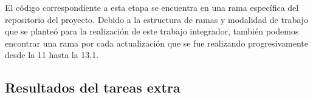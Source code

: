 El código correspondiente a esta etapa se encuentra en una rama específica del repositorio del proyecto. Debido a la estructura de ramas y modalidad de trabajo que se planteó para la realización de este trabajo integrador, también podemos encontrar una rama por cada actualización que se fue realizando progresivamente desde la 11 hasta la 13.1.\par


\subsection{Resultados del tareas extra}

